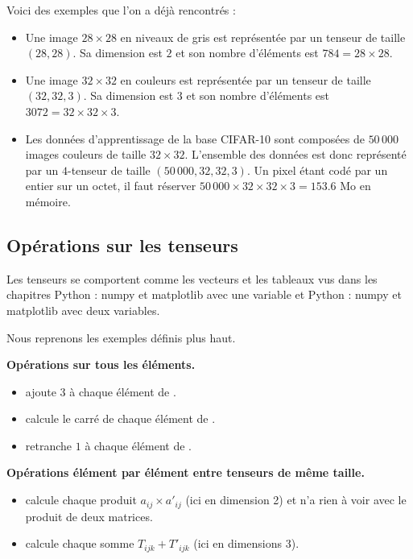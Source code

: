 \documentclass[11pt,class=report,crop=false]{standalone}
\begin{document}
\begin{itemize}
\begin{itemize}
    \end{itemize}    
\end{itemize}      
    

Voici des exemples que l'on a déjà rencontrés :
\begin{itemize}
  \item Une image $28\times28$ en niveaux de gris est représentée par un tenseur de taille $(28, 28)$. 
  Sa dimension est $2$ et son nombre d'éléments est $784 = 28 \times 28$.
\item Une image $32\times32$ en couleurs est représentée par un tenseur de taille $(32, 32,3)$. Sa dimension est $3$ et son nombre d'éléments est $3072 = 32 \times 32 \times 3$.
\item Les données d'apprentissage de la base CIFAR-10 sont composées de $50\,000$ images couleurs de taille $32\times32$. L'ensemble des données est donc représenté par un $4$-tenseur de taille $(50\,000,32,32,3)$. Un pixel étant codé par un entier sur un octet, il faut réserver $50\,000 \times 32 \times 32 \times 3 = 153.6$ Mo en mémoire.
\end{itemize}


\subsection{Opérations sur les tenseurs}

Les tenseurs se comportent comme les vecteurs et les tableaux \numpy{} vus dans les chapitres \og{}Python : numpy et matplotlib avec une variable\fg{}
et \og{}Python : numpy et matplotlib avec deux variables\fg{}.

Nous reprenons les exemples définis plus haut.

\textbf{Opérations sur tous les éléments.}
\begin{itemize}
  \item {} ajoute $3$ à chaque élément de .
  \item {} calcule le carré de chaque élément de .
  \item {} retranche $1$ à chaque élément de .
\end{itemize}

\textbf{Opérations élément par élément entre tenseurs de même taille.}
\begin{itemize}
  \item {} calcule chaque produit $a_{ij}\times a'_{ij}$ (ici en dimension 2) et n'a rien à voir avec le produit de deux matrices.
  \item {} calcule chaque somme $T_{ijk}+T'_{ijk}$ (ici en dimensions 3).
\end{itemize}
\end{document}
